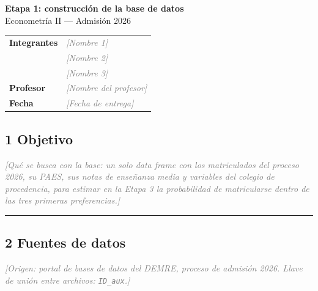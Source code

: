 \documentclass[11pt,letterpaper]{article}
\newcommand{\completar}[1]{\textcolor{gray}{\textit{[#1]}}}
\begin{document}
\begin{center}
  {\LARGE \textbf{Etapa 1: construcción de la base de datos}}\\[4pt]
  {\large Econometría II --- Admisión 2026}
\end{center}
\vspace{0.5em}

\begin{center}
\begin{tabular}{ll}
\toprule
\textbf{Integrantes} & \completar{Nombre 1} \\
                     & \completar{Nombre 2} \\
                     & \completar{Nombre 3} \\
\midrule
\textbf{Profesor}    & \completar{Nombre del profesor} \\
\textbf{Fecha}       & \completar{Fecha de entrega} \\
\bottomrule
\end{tabular}
\end{center}

\bigskip

\subsection*{1 \; Objetivo}

\completar{Qué se busca con la base: un solo data frame con los
matriculados del proceso 2026, su PAES, sus notas de enseñanza media y
variables del colegio de procedencia, para estimar en la Etapa 3 la
probabilidad de matricularse dentro de las tres primeras preferencias.}

\medskip\hrule\medskip

\subsection*{2 \; Fuentes de datos}

\completar{Origen: portal de bases de datos del DEMRE, proceso de admisión
2026. Llave de unión entre archivos: \texttt{ID\_aux}.}
\end{document}
